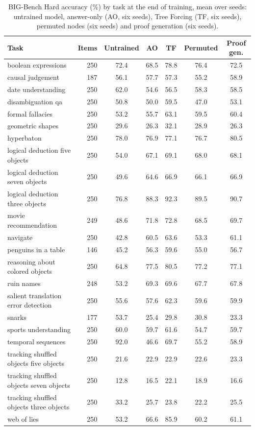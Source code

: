 \documentclass[10pt]{article}
\newcommand{\tf}{Tree Forcing}
\begin{document}
\begin{table}[h]
\centering
\scriptsize
\caption{BIG-Bench Hard accuracy (\%) by task at the end of training, mean over seeds: untrained model, answer-only (AO,
six seeds), \tf{} (TF, six seeds), permuted nodes (six seeds) and proof generation (six seeds).}
\label{tab:bbhtask}
\begin{tabular}{lrccccc}
\toprule
Task & Items & Untrained & AO & TF & Permuted & Proof gen. \\
\midrule
boolean expressions & 250 & 72.4 & 68.5 & 78.8 & 76.4 & 72.5 \\
causal judgement & 187 & 56.1 & 57.7 & 57.3 & 55.2 & 58.9 \\
date understanding & 250 & 62.0 & 54.6 & 56.5 & 58.3 & 58.5 \\
disambiguation qa & 250 & 50.8 & 50.0 & 59.5 & 47.0 & 53.1 \\
formal fallacies & 250 & 53.2 & 55.7 & 63.1 & 59.5 & 60.4 \\
geometric shapes & 250 & 29.6 & 26.3 & 32.1 & 28.9 & 26.3 \\
hyperbaton & 250 & 78.0 & 76.9 & 77.1 & 76.7 & 80.5 \\
logical deduction five objects & 250 & 54.0 & 67.1 & 69.1 & 68.0 & 68.1 \\
logical deduction seven objects & 250 & 49.6 & 64.6 & 66.9 & 66.1 & 66.9 \\
logical deduction three objects & 250 & 76.8 & 88.3 & 92.3 & 89.5 & 90.7 \\
movie recommendation & 249 & 48.6 & 71.8 & 72.8 & 68.5 & 69.7 \\
navigate & 250 & 42.8 & 60.5 & 63.6 & 53.3 & 61.1 \\
penguins in a table & 146 & 45.2 & 56.3 & 59.6 & 55.0 & 56.7 \\
reasoning about colored objects & 250 & 64.8 & 77.5 & 80.5 & 77.2 & 77.1 \\
ruin names & 248 & 53.2 & 69.3 & 69.6 & 67.7 & 67.8 \\
salient translation error detection & 250 & 55.6 & 57.6 & 62.3 & 59.6 & 59.9 \\
snarks & 177 & 53.7 & 25.4 & 29.8 & 30.8 & 23.3 \\
sports understanding & 250 & 60.0 & 59.7 & 61.6 & 54.7 & 59.7 \\
temporal sequences & 250 & 92.0 & 46.6 & 69.7 & 55.2 & 58.9 \\
tracking shuffled objects five objects & 250 & 21.6 & 22.9 & 22.9 & 22.6 & 23.3 \\
tracking shuffled objects seven objects & 250 & 12.8 & 16.5 & 22.1 & 18.9 & 16.6 \\
tracking shuffled objects three objects & 250 & 33.2 & 25.7 & 23.8 & 22.2 & 25.5 \\
web of lies & 250 & 53.2 & 66.6 & 85.9 & 60.2 & 61.1 \\
\bottomrule
\end{tabular}
\end{table}
\end{document}
